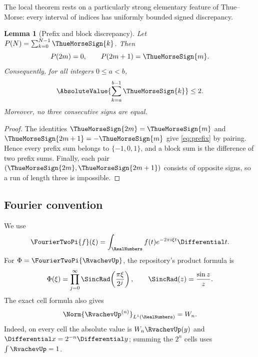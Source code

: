 \documentclass[11pt,a4paper]{article}
\newtheorem{lemma}[theorem]{Lemma}
\theoremstyle{definition}
\theoremstyle{remark}
\begin{document}
The local theorem rests on a particularly strong elementary feature of
Thue--Morse: every interval of indices has uniformly bounded signed discrepancy.

\begin{lemma}[Prefix and block discrepancy]
\label{lem:tm-discrepancy}
Let $P(N)=\sum_{k=0}^{N-1}\ThueMorseSign{k}$.  Then
\begin{equation}
  P(2m)=0,
  \qquad
  P(2m+1)=\ThueMorseSign{m}.
  \label{eq:prefix}
\end{equation}
Consequently, for all integers $0\le a<b$,
\begin{equation}
  \AbsoluteValue{\sum_{k=a}^{b-1}\ThueMorseSign{k}}\le2.
  \label{eq:block-discrepancy}
\end{equation}
Moreover, no three consecutive signs are equal.
\end{lemma}

\begin{proof}
The identities $\ThueMorseSign{2m}=\ThueMorseSign{m}$ and
$\ThueMorseSign{2m+1}=-\ThueMorseSign{m}$ give
\eqref{eq:prefix} by pairing.  Hence every prefix sum belongs to
$\{-1,0,1\}$, and a block sum is the difference of two prefix sums.  Finally,
each pair $(\ThueMorseSign{2m},\ThueMorseSign{2m+1})$ consists of opposite
signs, so a run of length
three is impossible.
\end{proof}

\subsection{Fourier convention}

We use
\begin{equation}
  \FourierTwoPi{f}(\xi)=\int_{\RealNumbers}f(t)e^{-2\pi i\xi t}\Differential t.
  \label{eq:fourier-convention}
\end{equation}
For $\Phi=\FourierTwoPi{\RvachevUp}$, the repository's product formula is
\begin{equation}
  \Phi(\xi)=\prod_{j=0}^{\infty}
  \SincRad\!\left(\frac{\pi\xi}{2^j}\right),
  \qquad
  \SincRad(z)=\frac{\sin z}{z}.
  \label{eq:sinc-product}
\end{equation}
The exact cell formula also gives
\begin{equation}
  \Norm{\RvachevUp^{(n)}}_{L^1(\RealNumbers)}=W_n.
  \label{eq:l1-derivative}
\end{equation}
Indeed, on every cell the absolute value is $W_n\RvachevUp(y)$ and
$\Differential x=2^{-n}\Differential y$; summing the $2^n$ cells uses $\int\RvachevUp=1$.
\end{document}
